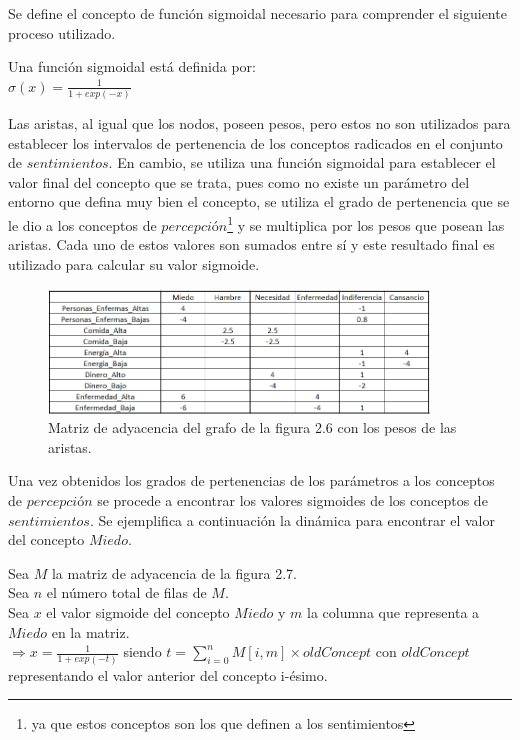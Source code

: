 Se define el concepto de función sigmoidal necesario para comprender el siguiente proceso utilizado.\autocite{Saeed2021}
\begin{center}
    Una función sigmoidal está definida por:\\
    $\sigma(x)= \frac{1}{1+exp(-x)}$
\end{center}

Las aristas, al igual que los nodos, poseen pesos, pero estos no son utilizados para establecer los intervalos
de pertenencia de los conceptos radicados en el conjunto de $sentimientos$. En cambio, se utiliza una función 
sigmoidal para establecer el valor final del concepto que se trata, pues como no existe un parámetro del 
entorno que defina muy bien el concepto, se utiliza el grado de pertenencia que se le dio a los conceptos
de $percepci$ó$n$\footnote{ya que estos conceptos son los que definen a los sentimientos} y se multiplica por los pesos 
que posean las aristas. Cada uno de estos valores son sumados entre sí y este resultado final es utilizado 
para calcular su valor sigmoide.

\begin{figure}[htb]
    \centering
    \includegraphics[width=0.9\textwidth]{Graphics/Pesos_aristas_Pers_Sent.png}
    \caption{Matriz de adyacencia del grafo de la figura 2.6 con los pesos de las aristas.}
\end{figure}

Una vez obtenidos los grados de pertenencias de los parámetros a los conceptos de $percepci$ó$n$ se procede 
a encontrar los valores sigmoides de los conceptos de $sentimientos$. Se ejemplifica a continuación la dinámica
para encontrar el valor del concepto $Miedo$.
\begin{center}
    Sea $M$ la matriz de adyacencia de la figura 2.7.\\
    Sea $n$ el número total de filas de $M$.\\
    Sea $x$ el valor sigmoide del concepto $Miedo$ y $m$ la columna que representa a $Miedo$ en la matriz.\\
    $\Rightarrow x = \frac{1}{1+ exp(-t)}$ siendo $t = \sum_{i=0}^{n}M[i,m]\times oldConcept$ con $oldConcept$
    representando el valor anterior del concepto i-ésimo.
\end{center}

